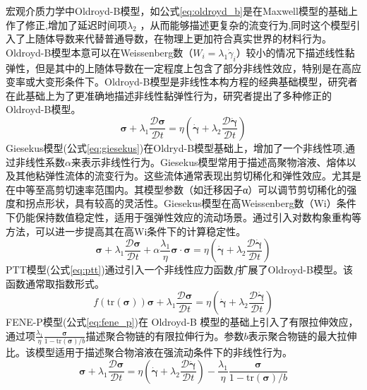 宏观介质力学中Oldroyd-B模型，如公式\eqref{eq:oldroyd_b}是在Maxwell模型的基础上作了修正,增加了延迟时间项$\lambda_2$ ，从而能够描述更复杂的流变行为,同时这个模型引入了上随体导数来代替普通导数，在物理上更加符合真实世界的材料行为。Oldroyd-B模型本意可以在Weissenberg数（$W_i=\lambda_1 \dot{\gamma}_i$）较小的情况下描述线性黏弹性，但是其中的上随体导数在一定程度上包含了部分非线性效应，特别是在高应变率或大变形条件下。Oldroyd-B模型是非线性本构方程的经典基础模型，研究者在此基础上为了更准确地描述非线性黏弹性行为，研究者提出了多种修正的 Oldroyd-B模型。
\begin{equation}
	\boldsymbol{\sigma} + \lambda_1 \frac{\mathcal{D}\boldsymbol{\sigma}}{\mathcal{D}t} = \eta \left( \dot{\boldsymbol{\gamma}} + \lambda_2 \frac{\mathcal{D}\dot{\boldsymbol{\gamma}}}{\mathcal{D}t} \right) \label{eq:oldroyd_b}
\end{equation}
Giesekus模型(公式\eqref{eq:giesekus})在Oldryd-B模型基础上，增加了一个非线性项,通过非线性系数$\alpha$来表示非线性行为。Giesekus模型常用于描述高聚物溶液、熔体以及其他粘弹性流体的流变行为。这些流体通常表现出剪切稀化和弹性效应。尤其是在中等至高剪切速率范围内。其模型参数（如迁移因子α）可以调节剪切稀化的强度和拐点形状，具有较高的灵活性。Giesekus模型在高Weissenberg数（Wi）条件下仍能保持数值稳定性，适用于强弹性效应的流动场景。通过引入对数构象重构等方法，可以进一步提高其在高Wi条件下的计算稳定性。
\begin{equation}
	\boldsymbol{\sigma} + \lambda_1 \frac{\mathcal{D}\boldsymbol{\sigma}}{\mathcal{D}t} + \alpha \frac{\lambda_1}{\eta} \boldsymbol{\sigma} \cdot \boldsymbol{\sigma} = \eta \left( \dot{\boldsymbol{\gamma}} + \lambda_2 \frac{\mathcal{D}\dot{\boldsymbol{\gamma}}}{\mathcal{D}t} \right) \label{eq:giesekus}
\end{equation}
PTT模型(公式\eqref{eq:ptt})通过引入一个非线性应力函数$f$扩展了Oldroyd-B模型。该函数通常取指数形式。
\begin{equation}
	f(\text{tr}(\boldsymbol{\sigma})) \boldsymbol{\sigma} + \lambda_1 \frac{\mathcal{D}\boldsymbol{\sigma}}{\mathcal{D}t} = \eta \left( \dot{\boldsymbol{\gamma}} + \lambda_2 \frac{\mathcal{D}\dot{\boldsymbol{\gamma}}}{\mathcal{D}t} \right) \label{eq:ptt}
\end{equation}
FENE-P模型(公式\eqref{eq:fene_p})在 Oldroyd-B 模型的基础上引入了有限拉伸效应，通过项$\frac{\lambda_1}{\eta} \frac{\boldsymbol{\sigma}}{1 - \text{tr}(\boldsymbol{\sigma})/b}$描述聚合物链的有限拉伸行为。参数$b$表示聚合物链的最大拉伸比。该模型适用于描述聚合物溶液在强流动条件下的非线性行为。
\begin{equation}
	\boldsymbol{\sigma} + \lambda_1 \frac{\mathcal{D}\boldsymbol{\sigma}}{\mathcal{D}t} = \eta \left( \dot{\boldsymbol{\gamma}} + \lambda_2 \frac{\mathcal{D}\dot{\boldsymbol{\gamma}}}{\mathcal{D}t} \right) - \frac{\lambda_1}{\eta} \frac{\boldsymbol{\sigma}}{1 - \text{tr}(\boldsymbol{\sigma})/b} \label{eq:fene_p}
\end{equation}
